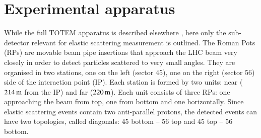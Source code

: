 \section{Experimental apparatus}

While the full TOTEM apparatus is described elsewhere \cite{totem-jinst}, here only the sub-detector
relevant for elastic scattering measurement is outlined. The Roman Pots (RPs) are movable beam pipe
insertions that approach the LHC beam very closely in order to detect particles scattered to very 
small angles. They are organised in two stations, one on the left (sector 45), one on the right
(sector 56) side of the interaction point (IP). Each station is formed by two units: near ($214\,{\rm m}$
from the IP) and far ($220\,{\rm m}$). Each unit consists of three RPs: one approaching the beam from top,
one from bottom and one horizontally. Since elastic scattering events contain two anti-parallel protons,
the detected events can have two topologies, called diagonals: 45 bottom -- 56 top and 45 top -- 56 bottom.

